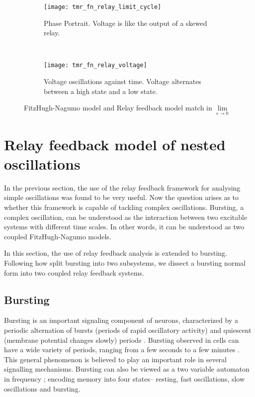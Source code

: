 \documentclass[a4paper, 12pt]{article}
\begin{document}
\begin{figure}[h!]
    \centering
    \begin{subfigure}[t]{0.45\textwidth}
        \texttt{[image: tmr\_fn\_relay\_limit\_cycle]}
        \caption{Phase Portrait. Voltage is like the output of a skewed relay.}
        \label{fig:f_n_relay_limit_cycle}
    \end{subfigure}
    ~ %
    \begin{subfigure}[t]{0.45\textwidth}
        \texttt{[image: tmr\_fn\_relay\_voltage]}
        \caption{Voltage oscillations against time. Voltage alternates between a high state and a low state.}
        \label{fig:f_n_relay_voltage}
    \end{subfigure}
\caption{FitzHugh-Nagumo model and Relay feedback model match in $\lim\limits_{\epsilon\to 0}$}
\label{fig:matching_fitz_relay}
\end{figure}

\FloatBarrier


\section{Relay feedback model of nested oscillations}\label{Sec:nested oscillations}
In the previous section, the use of the relay feedback framework for analysing simple oscillations was found to be very useful. Now the question arises as to whether this framework is capable of tackling complex oscillations. Bursting, a complex oscillation, can be understood as the interaction between two excitable systems with different time scales\cite{drion}. In other words, it can be understood as two coupled FitzHugh-Nagumo models. 

In this section, the use of relay feedback analysis is extended to bursting. Following how \cite{rinzel} split bursting into two subsystems, we dissect a bursting normal form into two coupled relay feedback systems. 

\subsection{Bursting}
Bursting is an important signaling component of neurons, characterized by a periodic alternation of bursts (periods of rapid oscillatory activity) and quiescent (membrane potential changes slowly) periods \cite{franci2}. Bursting observed in cells can have a wide variety of periods, ranging from a few seconds to a few minutes \cite{keener}. This general phenomenon is believed to play an important role in several signalling mechanisms. Bursting can also be viewed as a two variable automaton in frequency \cite{drion}; encoding memory into four states-- resting, fast oscillations, slow oscillations and bursting. 
\end{document}
